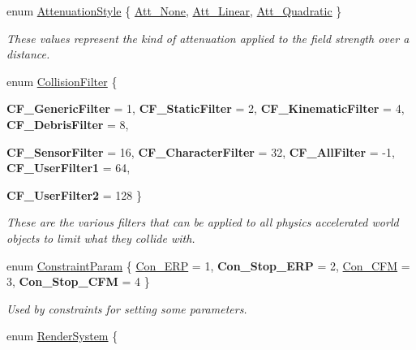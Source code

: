 \begin{DoxyCompactItemize}
enum \hyperlink{namespaceMezzanine_a2d10a79e11a2031df10af540eede12fa}{AttenuationStyle} \{ \hyperlink{namespaceMezzanine_a2d10a79e11a2031df10af540eede12faa548ff9c1d108b12ea6323d39c41856f5}{Att\_\-None}, 
\hyperlink{namespaceMezzanine_a2d10a79e11a2031df10af540eede12faaaecc4b0547a61e5b2abd5401182c9470}{Att\_\-Linear}, 
\hyperlink{namespaceMezzanine_a2d10a79e11a2031df10af540eede12faa7f0c2854461a843af7eb21c036375e83}{Att\_\-Quadratic}
 \}
\begin{DoxyCompactList}\small\item\em These values represent the kind of attenuation applied to the field strength over a distance. \item\end{DoxyCompactList}\item 
enum \hyperlink{namespaceMezzanine_a475283a31c5df11f18e059953f32ace2}{CollisionFilter} \{ \par
{\bfseries CF\_\-GenericFilter} =  1, 
{\bfseries CF\_\-StaticFilter} =  2, 
{\bfseries CF\_\-KinematicFilter} =  4, 
{\bfseries CF\_\-DebrisFilter} =  8, 
\par
{\bfseries CF\_\-SensorFilter} =  16, 
{\bfseries CF\_\-CharacterFilter} =  32, 
{\bfseries CF\_\-AllFilter} =  -\/1, 
{\bfseries CF\_\-UserFilter1} =  64, 
\par
{\bfseries CF\_\-UserFilter2} =  128
 \}
\begin{DoxyCompactList}\small\item\em These are the various filters that can be applied to all physics accelerated world objects to limit what they collide with. \item\end{DoxyCompactList}\item 
enum \hyperlink{namespaceMezzanine_a6c62e8c2938fb203eb7a7072c12176f4}{ConstraintParam} \{ \hyperlink{namespaceMezzanine_a6c62e8c2938fb203eb7a7072c12176f4aa7c686c7bf5328e60c31d6ab05c3dc90}{Con\_\-ERP} =  1, 
{\bfseries Con\_\-Stop\_\-ERP} =  2, 
\hyperlink{namespaceMezzanine_a6c62e8c2938fb203eb7a7072c12176f4a0ae9de16fc96d34ee601f9516d43b9b8}{Con\_\-CFM} =  3, 
{\bfseries Con\_\-Stop\_\-CFM} =  4
 \}
\begin{DoxyCompactList}\small\item\em Used by constraints for setting some parameters. \item\end{DoxyCompactList}\item 
enum \hyperlink{namespaceMezzanine_a1bb0347c37954bc71c4344e4b55c729a}{RenderSystem} \{ \par

\end{DoxyCompactItemize}
